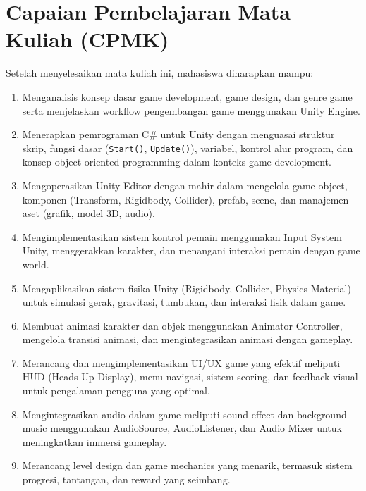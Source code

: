\section{Capaian Pembelajaran Mata Kuliah (CPMK)}

Setelah menyelesaikan mata kuliah ini, mahasiswa diharapkan mampu:

\begin{enumerate}[label=CPMK\arabic*:]
\item Menganalisis konsep dasar game development, game design, dan genre game serta menjelaskan workflow pengembangan game menggunakan Unity Engine.

\item Menerapkan pemrograman C\# untuk Unity dengan menguasai struktur skrip, fungsi dasar (\texttt{Start()}, \texttt{Update()}), variabel, kontrol alur program, dan konsep object-oriented programming dalam konteks game development.

\item Mengoperasikan Unity Editor dengan mahir dalam mengelola game object, komponen (Transform, Rigidbody, Collider), prefab, scene, dan manajemen aset (grafik, model 3D, audio).

\item Mengimplementasikan sistem kontrol pemain menggunakan Input System Unity, menggerakkan karakter, dan menangani interaksi pemain dengan game world.

\item Mengaplikasikan sistem fisika Unity (Rigidbody, Collider, Physics Material) untuk simulasi gerak, gravitasi, tumbukan, dan interaksi fisik dalam game.

\item Membuat animasi karakter dan objek menggunakan Animator Controller, mengelola transisi animasi, dan mengintegrasikan animasi dengan gameplay.

\item Merancang dan mengimplementasikan UI/UX game yang efektif meliputi HUD (Heads-Up Display), menu navigasi, sistem scoring, dan feedback visual untuk pengalaman pengguna yang optimal.

\item Mengintegrasikan audio dalam game meliputi sound effect dan background music menggunakan AudioSource, AudioListener, dan Audio Mixer untuk meningkatkan immersi gameplay.

\item Merancang level design dan game mechanics yang menarik, termasuk sistem progresi, tantangan, dan reward yang seimbang.


\end{enumerate}
